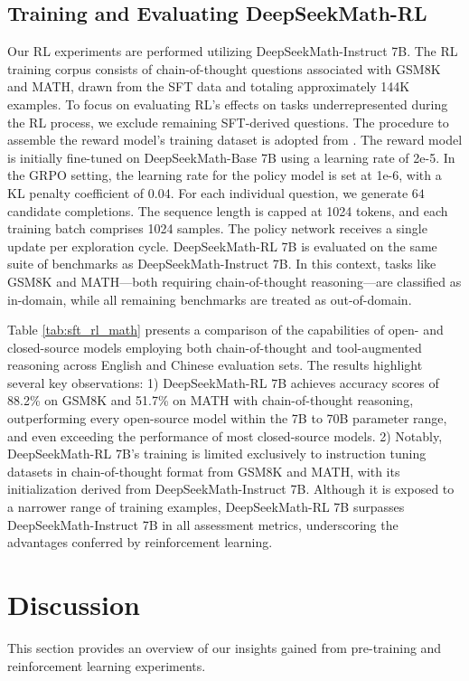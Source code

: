 \begin{itemize}[topsep=0pt]
\begin{itemize}[topsep=0pt]
\subsection{Training and Evaluating DeepSeekMath-RL}

Our RL experiments are performed utilizing DeepSeekMath-Instruct 7B. The RL training corpus consists of chain-of-thought questions associated with GSM8K and MATH, drawn from the SFT data and totaling approximately 144K examples. To focus on evaluating RL's effects on tasks underrepresented during the RL process, we exclude remaining SFT-derived questions. The procedure to assemble the reward model’s training dataset is adopted from \citep{wang2023math}. The reward model is initially fine-tuned on DeepSeekMath-Base 7B using a learning rate of 2e-5. In the GRPO setting, the learning rate for the policy model is set at 1e-6, with a KL penalty coefficient of 0.04. For each individual question, we generate $64$ candidate completions. The sequence length is capped at 1024 tokens, and each training batch comprises 1024 samples. The policy network receives a single update per exploration cycle. DeepSeekMath-RL 7B is evaluated on the same suite of benchmarks as DeepSeekMath-Instruct 7B. In this context, tasks like GSM8K and MATH—both requiring chain-of-thought reasoning—are classified as in-domain, while all remaining benchmarks are treated as out-of-domain.

Table \ref{tab:sft_rl_math} presents a comparison of the capabilities of open- and closed-source models employing both chain-of-thought and tool-augmented reasoning across English and Chinese evaluation sets. The results highlight several key observations: 1) DeepSeekMath-RL 7B achieves accuracy scores of 88.2\% on GSM8K and 51.7\% on MATH with chain-of-thought reasoning, outperforming every open-source model within the 7B to 70B parameter range, and even exceeding the performance of most closed-source models. 2) Notably, DeepSeekMath-RL 7B's training is limited exclusively to instruction tuning datasets in chain-of-thought format from GSM8K and MATH, with its initialization derived from DeepSeekMath-Instruct 7B. Although it is exposed to a narrower range of training examples, DeepSeekMath-RL 7B surpasses DeepSeekMath-Instruct 7B in all assessment metrics, underscoring the advantages conferred by reinforcement learning.

\section{Discussion}
This section provides an overview of our insights gained from pre-training and reinforcement learning experiments.


\end{itemize}
\end{itemize}
